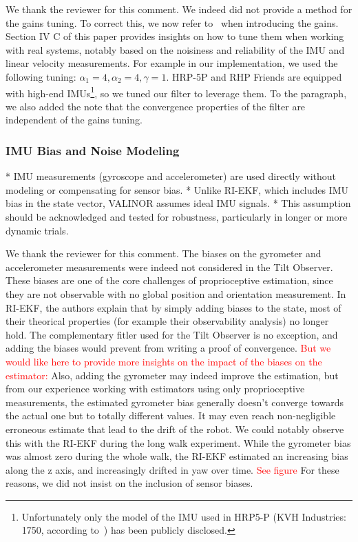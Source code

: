 We thank the reviewer for this comment. We indeed did not provide a method for the gains tuning. To correct this, we now refer to~\cite{benallegue2023velocity} when introducing the gains. Section IV C of this paper provides insights on how to tune them when working with real systems, notably based on the noisiness and reliability of the IMU and linear velocity measurements. For example in our implementation, we used the following tuning: $\alpha_{1} = 4, \alpha_{2} = 4, \gamma = 1$. HRP-5P and RHP Friends are equipped with high-end IMUs\footnote{Unfortunately only the model of the IMU used in HRP5-P (KVH Industries: 1750, according to~\cite{Kaneko2019Hrp5}) has been publicly disclosed.}, so we tuned our filter to leverage them. 
To the paragraph, we also added the note that the convergence properties of the filter are independent of the gains tuning. 

\subsubsection{IMU Bias and Noise Modeling}

\begin{revquote}
* IMU measurements (gyroscope and accelerometer) are used directly without modeling or compensating for sensor bias.
* Unlike RI-EKF, which includes IMU bias in the state vector, VALINOR assumes ideal IMU signals.
* This assumption should be acknowledged and tested for robustness, particularly in longer or more dynamic trials.
\end{revquote}

We thank the reviewer for this comment. The biases on the gyrometer and accelerometer measurements were indeed not considered in the Tilt Observer. These biases are one of the core challenges of proprioceptive estimation, since they are not observable with no global position and orientation measurement. In RI-EKF, the authors explain that by simply adding biases to the state, most of their theorical properties (for example their observability analysis) no longer hold. The complementary fitler used for the Tilt Observer is no exception, and adding the biases would prevent from writing a proof of convergence.
\textcolor{red}{
But we would like here to provide more insights on the impact of the biases on the estimator:}
Also, adding the gyrometer may indeed improve the estimation, but from our experience working with estimators using only proprioceptive measurements, the estimated gyrometer bias generally doesn't converge towards the actual one but to totally different values. It may even reach non-negligible erroneous estimate that lead to the drift of the robot. We could notably observe this with the RI-EKF during the long walk experiment. While the gyrometer bias was almost zero during the whole walk, the RI-EKF estimated an increasing bias along the z axis, and increasingly drifted in yaw over time.   \textcolor{red}{See figure}
For these reasons, we did not insist on the inclusion of sensor biases.

